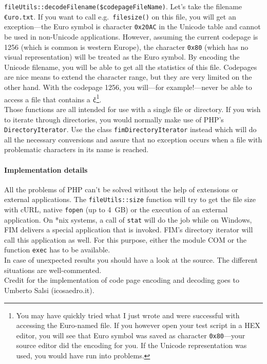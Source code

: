 \documentclass{scrartcl}
\begin{document}
      \lstinline!fileUtils::decodeFilename($codepageFileName)!. Let's take the filename \texttt{€uro.txt}. If you want to call e.g.\ \lstinline!filesize()! on this file, you will get an exception---the Euro symbol is character \lstinline!0x20AC! in the Unicode table and cannot be used in non-Unicode applications. However, assuming the current codepage is 1256 (which is common is western Europe), the character \lstinline!0x80! (which has no visual representation) will be treated as the Euro symbol. By encoding the Unicode filename, you will be able to get all the statistics of this file. Codepages are nice means to extend the character range, but they are very limited on the other hand. With the codepage 1256, you will---for example!---never be able to access a file that contains a \texttt{č}\footnote{You may have quickly tried what I just wrote and were successful with accessing the Euro-named file. If you however open your test script in a HEX editor, you will see that Euro symbol was saved as character \lstinline!0x80!---your source editor did the encoding for you. If the Unicode representation was used, you would have run into problems.}. \\
      Those functions are all intended for use with a single file or directory. If you wish to iterate through directories, you would normally make use of PHP's \lstinline!DirectoryIterator!. Use the class \lstinline!fimDirectoryIterator! instead which will do all the necessary conversions and assure that no exception occurs when a file with problematic characters in its name is reached.
      \paragraph{Implementation details}
         All the problems of PHP can't be solved without the help of extensions or external applications. The \lstinline!fileUtils::size! function will try to get the file size with cURL, native \lstinline!fopen! (up to 4~GB) or the execution of an external application. On *nix systems, a call of \texttt{stat} will do the job while on Windows, FIM delivers a special application that is invoked. FIM's directory iterator will call this application as well. For this purpose, either the module COM or the function \lstinline!exec! has to be available. \\
         In case of unexpected results you should have a look at the source. The different situations are well-commented. \\
         Credit for the implementation of code page encoding and decoding goes to Umberto Salsi (icosaedro.it).
\end{document}
